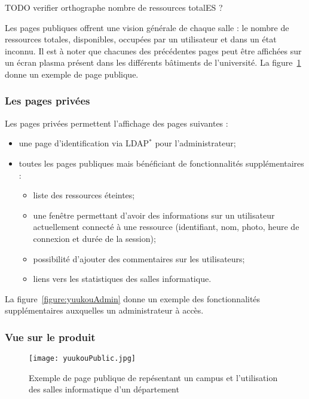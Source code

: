  TODO verifier orthographe nombre de ressources totalES ?

Les pages publiques offrent une vision g\'en\'erale de chaque salle : le nombre de ressources totales, disponibles, occup\'ees par un utilisateur et dans un \'etat inconnu.
Il est \`a noter que chacunes des pr\'ec\'edentes pages peut \^etre affich\'ees sur un \'ecran plasma pr\'esent dans les diff\'erents b\^atiments de l'universit\'e.
La figure~\ref{figure:yuukouPublic} donne un exemple de page publique.

\subsubsection{Les pages priv\'ees}

\noindent Les pages priv\'ees permettent l'affichage des pages suivantes :
\begin{itemize}
	\item une page d'identification via LDAP$^*$ pour l'administrateur;
	\item toutes les pages publiques mais b\'en\'eficiant de fonctionnalit\'es suppl\'ementaires :
	\begin{itemize}
		\item liste des ressources \'eteintes;
		\item une fen\^etre permettant d'avoir des informations sur un utilisateur actuellement connect\'e \`a une ressource (identifiant, nom, photo, heure de connexion et dur\'ee de la session);
		\item possibilit\'e d'ajouter des commentaires sur les utilisateurs;
		\item liens vers les statistiques des salles informatique.

	\end{itemize}

\end{itemize}

La figure~\ref{figure:yuukouAdmin} donne un exemple des fonctionnalit\'es suppl\'ementaires auxquelles un administrateur \`a acc\`es.

\clearpage

\subsubsection{Vue sur le produit}

\begin{figure}[!ht]
	\centering
	\texttt{[image: yuukouPublic.jpg]}
	\caption{Exemple de page publique de \Yuukou{} rep\'esentant un campus et l'utilisation des salles informatique d'un d\'epartement}
	\label{figure:yuukouPublic}

\end{figure}

